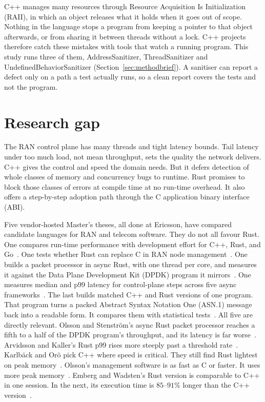 \documentclass[english,oneside,a4paper,censored,csm,software-track-2020]{HYthesisML}
\begin{document}
C++ manages many resources through Resource Acquisition Is Initialization (RAII), in
which an object releases what it holds when it goes out of scope. Nothing in the language
stops a program from keeping a pointer to that object afterwards, or from sharing it
between threads without a lock. C++ projects therefore catch these mistakes
with tools that watch a running program. This study runs three of them, AddressSanitizer,
ThreadSanitizer and UndefinedBehaviorSanitizer (Section~\ref{sec:methodbrief}). A sanitiser can report a
defect only on a path a test actually runs, so a clean report covers the tests and not the
program.

\section{Research gap}\label{sec:gap}
The RAN control plane has many threads and
tight latency bounds. Tail latency under too much load, not mean throughput, sets
the quality the network delivers. C++ gives the control and speed the domain
needs. But it defers detection of whole classes of memory and concurrency bugs
to runtime. Rust promises to block those classes of errors at compile time at no
run-time overhead. It also offers a step-by-step adoption path through the C
application binary interface (ABI).

Five vendor-hosted Master's theses, all
done at Ericsson, have compared candidate languages for RAN and telecom
software. They do not all favour Rust. One compares run-time performance with
development effort for C++,
Rust, and Go~\cite{karlback2021ran}. One tests whether Rust can replace C in
RAN node management~\cite{olsson2023ranmgmt}. One builds a packet processor in
async Rust, with one thread per core, and measures it against the Data Plane
Development Kit (DPDK) program it mirrors~\cite{olsson2023asyncpackets}. One
measures median and p99 latency for control-plane steps across five async
frameworks~\cite{arvidsson2025async}. The last builds matched C++ and Rust
versions of one program. That program turns a packed Abstract Syntax Notation
One (ASN.1) message back into a readable form. It compares
them with statistical tests~\cite{emberg2023asn1}. All five are directly
relevant. Olsson and Stenstr\"om's async Rust packet
processor reaches a fifth to a half of the DPDK program's throughput, and its
latency is far worse~\cite{olsson2023asyncpackets}. Arvidsson and Kaller's Rust p99 rises
more steeply past a threshold rate~\cite{arvidsson2025async}. Karlb\"ack and
Or\"o pick C++ where speed is critical. They still find Rust lightest on peak
memory~\cite{karlback2021ran}. Olsson's management software is as fast as C or
faster. It uses more peak memory~\cite{olsson2023ranmgmt}. Emberg and
Wadsten's Rust version is comparable to C++ in one session. In the next, its
execution time is $85$--$91\%$ longer than the C++ version~\cite{emberg2023asn1}.
\end{document}

